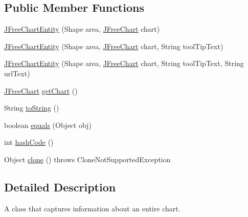 \subsection*{Public Member Functions}
\begin{DoxyCompactItemize}
\item 
\mbox{\hyperlink{classorg_1_1jfree_1_1chart_1_1entity_1_1_j_free_chart_entity_a42a1abe4eca032b3052642ae66242520}{J\+Free\+Chart\+Entity}} (Shape area, \mbox{\hyperlink{classorg_1_1jfree_1_1chart_1_1_j_free_chart}{J\+Free\+Chart}} chart)
\item 
\mbox{\hyperlink{classorg_1_1jfree_1_1chart_1_1entity_1_1_j_free_chart_entity_a2bfeeeff9db5f694429914213e90db4e}{J\+Free\+Chart\+Entity}} (Shape area, \mbox{\hyperlink{classorg_1_1jfree_1_1chart_1_1_j_free_chart}{J\+Free\+Chart}} chart, String tool\+Tip\+Text)
\item 
\mbox{\hyperlink{classorg_1_1jfree_1_1chart_1_1entity_1_1_j_free_chart_entity_acdd6c7335a6ceba2380b02e09fe34226}{J\+Free\+Chart\+Entity}} (Shape area, \mbox{\hyperlink{classorg_1_1jfree_1_1chart_1_1_j_free_chart}{J\+Free\+Chart}} chart, String tool\+Tip\+Text, String url\+Text)
\item 
\mbox{\hyperlink{classorg_1_1jfree_1_1chart_1_1_j_free_chart}{J\+Free\+Chart}} \mbox{\hyperlink{classorg_1_1jfree_1_1chart_1_1entity_1_1_j_free_chart_entity_a38a93753dc452286946d96658cf222d0}{get\+Chart}} ()
\item 
String \mbox{\hyperlink{classorg_1_1jfree_1_1chart_1_1entity_1_1_j_free_chart_entity_af0ee09cf39aa4f4ced8e7b1aa61b79d9}{to\+String}} ()
\item 
boolean \mbox{\hyperlink{classorg_1_1jfree_1_1chart_1_1entity_1_1_j_free_chart_entity_af600defcb3c77f9755ac60865d0ac95d}{equals}} (Object obj)
\item 
int \mbox{\hyperlink{classorg_1_1jfree_1_1chart_1_1entity_1_1_j_free_chart_entity_a7d6627e13ea6a9e183944e9a5911e0d9}{hash\+Code}} ()
\item 
Object \mbox{\hyperlink{classorg_1_1jfree_1_1chart_1_1entity_1_1_j_free_chart_entity_ab6f443a26944e0be3303d2560d51225b}{clone}} ()  throws Clone\+Not\+Supported\+Exception 
\end{DoxyCompactItemize}


\subsection{Detailed Description}
A class that captures information about an entire chart.

